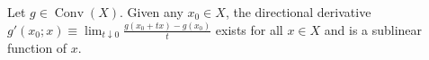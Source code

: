 Let $g \in \operatorname{Conv}(X)$. Given any $x_0 \in X$, the directional derivative $g'(x_0; x) \equiv \lim_{t \downarrow 0} \frac{g(x_0 + tx) - g(x_0)}{t}$ exists for all $x \in X$ and is a sublinear function of $x$.